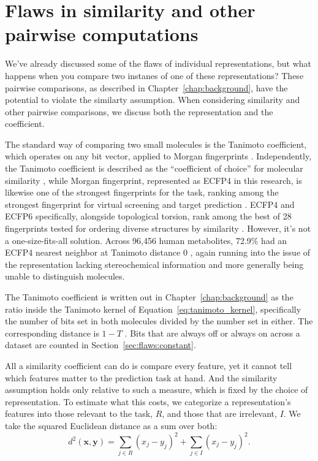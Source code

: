 \section{Flaws in similarity and other pairwise computations}\label{sec:flaws:similarity} %

We've already discussed some of the flaws of individual representations, but what happens when you compare two instanes of one of these representations? These pairwise comparisons, as described in Chapter~\ref{chap:background}, have the potential to violate the similarty assumption. When considering similarity and other pairwise comparisons, we discuss both the representation and the coefficient.  


The standard way of comparing two small molecules is the Tanimoto coefficient, which operates on any bit vector, applied to Morgan fingerprints \citep{LopezPerez2024}. Independently, the Tanimoto coefficient is described as the ``coefficient of choice'' for molecular similarity \citep{Bajusz2015}, while Morgan fingerprint, represented as ECFP4 in this research, is likewise one of the strongest fingerprints for the task, ranking among the strongest fingerprint for virtual screening and target prediction \citep{Capecchi2020}. ECFP4 and ECFP6 specifically, alongside topological torsion, rank among the best of 28 fingerprints tested for ordering diverse structures by similarity \citep{OBoyle2016}. However, it's not a one-size-fits-all solution. Across 96,456 human metabolites, 72.9\% had an ECFP4 nearest neighbor at Tanimoto distance 0 \citep{Capecchi2020}, again running into the issue of the representation lacking stereochemical information and more generally being unable to distinguish molecules. 

The Tanimoto coefficient is written out in Chapter~\ref{chap:background} as the ratio inside the Tanimoto kernel of Equation~\ref{eq:tanimoto_kernel}, specifically the number of bits set in both molecules divided by the number set in either. The corresponding distance is $1-T$ \citep{Bajusz2015}. Bits that are always off or always on across a dataset are counted in Section~\ref{sec:flaws:constant}. 


All a similarity coefficient can do is compare every feature, yet it cannot tell which features matter to the prediction task at hand. And the similarity assumption holds only relative to such a measure, which is fixed by the choice of representation. To estimate what this costs, we categorize a representation's features into those relevant to the task, $R$, and those that are irrelevant, $I$. We take the squared Euclidean distance as a sum over both:
\begin{equation}
d^2(\mathbf{x},\mathbf{y}) = \sum_{j \in R}(x_j-y_j)^2 + \sum_{j \in I}(x_j-y_j)^2 .
\label{eq:distance_split}
\end{equation}

